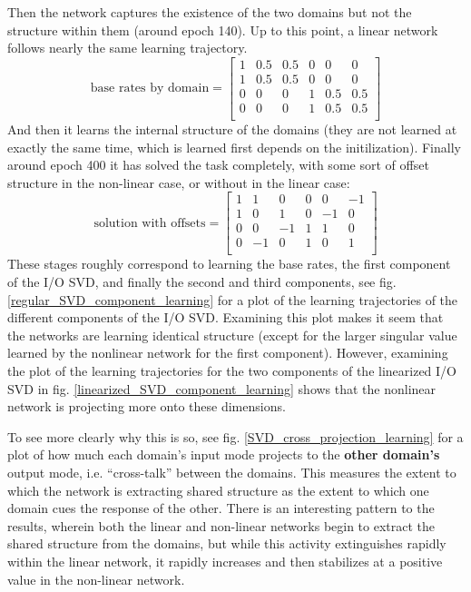 \documentclass[10pt,letterpaper]{article}
\begin{document}
Then the network captures the existence of the two domains but not the structure within them (around epoch 140). Up to this point, a linear network follows nearly the same learning trajectory.
\[ 
\text{base rates by domain} = \left[ \begin{matrix} 
1 & 0.5 & 0.5 & 0 & 0 & 0 \\
1 & 0.5 & 0.5 & 0 & 0 & 0 \\
0 & 0 & 0 & 1 & 0.5 & 0.5  \\
0 & 0 & 0 & 1 & 0.5 & 0.5  \\
\end{matrix}  \right] 
\] 
And then it learns the internal structure of the domains (they are not learned at exactly the same time, which is learned first depends on the initilization). Finally around epoch 400 it has solved the task completely, with some sort of offset structure in the non-linear case, or without in the linear case:
\[
\text{solution with offsets} = \left[ \begin{matrix} 
1 & 1 & 0 & 0 & 0 & -1 \\
1 & 0 & 1 & 0 & -1 & 0 \\
 0 & 0 & -1 & 1 & 1 & 0\\
 0 & -1 & 0 & 1 & 0 & 1\\
\end{matrix}  \right] 
\]
These stages roughly correspond to learning the base rates, the first component of the I/O SVD, and finally the second and third components, see fig. \ref{regular_SVD_component_learning} for a plot of the learning trajectories of the different components of the I/O SVD. Examining this plot makes it seem that the networks are learning identical structure (except for the larger singular value learned by the nonlinear network for the first component). However, examining the plot of the learning trajectories for the two components of the linearized I/O SVD in fig. \ref{linearized_SVD_component_learning} shows that the nonlinear network is projecting more onto these dimensions. \par 
To see more clearly why this is so, see fig. \ref{SVD_cross_projection_learning} for a plot of how much each domain's input mode projects to the \textbf{other domain's} output mode, i.e. ``cross-talk'' between the domains. This measures the extent to which the network is extracting shared structure as the extent to which one domain cues the response of the other. There is an interesting pattern to the results, wherein both the linear and non-linear networks begin to extract the shared structure from the domains, but while this activity extinguishes rapidly within the linear network, it rapidly increases and then stabilizes at a positive value in the non-linear network. \par
\end{document}
